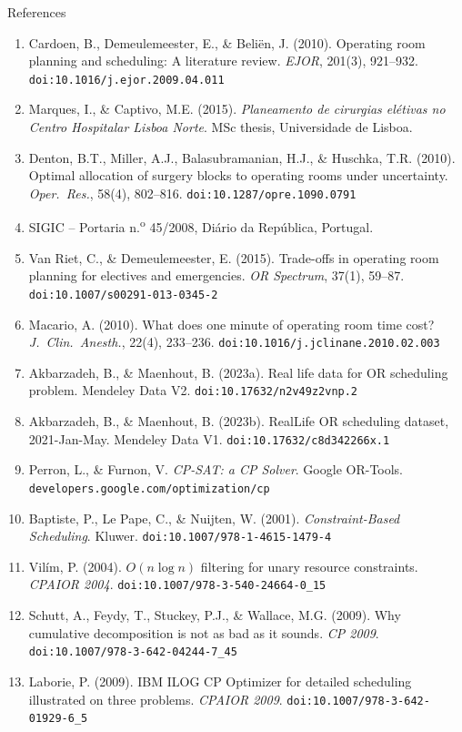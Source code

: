 \documentclass[10pt,aspectratio=169]{beamer}
\newcommand{\bk}{\hfill\hyperlink{toc}{\beamerreturnbutton{Agenda}}}
\begin{document}
\begin{frame}{References}
  \tiny
  \begin{enumerate}
    \item Cardoen, B., Demeulemeester, E., \& Beli\"en, J. (2010).
      Operating room planning and scheduling: A literature review.
      \emph{EJOR}, 201(3), 921--932.
      \texttt{doi:10.1016/j.ejor.2009.04.011}
    \item Marques, I., \& Captivo, M.E. (2015).
      \emph{Planeamento de cirurgias el\'etivas no Centro Hospitalar
      Lisboa Norte}. MSc thesis, Universidade de Lisboa.
    \item Denton, B.T., Miller, A.J., Balasubramanian, H.J., \&
      Huschka, T.R. (2010). Optimal allocation of surgery blocks to
      operating rooms under uncertainty. \emph{Oper.\ Res.}, 58(4),
      802--816. \texttt{doi:10.1287/opre.1090.0791}
    \item SIGIC -- Portaria n.\textsuperscript{o} 45/2008,
      Di\'ario da Rep\'ublica, Portugal.
    \item Van Riet, C., \& Demeulemeester, E. (2015). Trade-offs in
      operating room planning for electives and emergencies.
      \emph{OR Spectrum}, 37(1), 59--87.
      \texttt{doi:10.1007/s00291-013-0345-2}
    \item Macario, A. (2010). What does one minute of operating room
      time cost? \emph{J.\ Clin.\ Anesth.}, 22(4), 233--236.
      \texttt{doi:10.1016/j.jclinane.2010.02.003}
    \item Akbarzadeh, B., \& Maenhout, B. (2023a). Real life data for
      OR scheduling problem. Mendeley Data V2.
      \texttt{doi:10.17632/n2v49z2vnp.2}
    \item Akbarzadeh, B., \& Maenhout, B. (2023b). RealLife OR
      scheduling dataset, 2021-Jan-May. Mendeley Data V1.
      \texttt{doi:10.17632/c8d342266x.1}
    \item Perron, L., \& Furnon, V. \emph{CP-SAT: a CP Solver}.
      Google OR-Tools.
      \texttt{developers.google.com/optimization/cp}
    \item Baptiste, P., Le Pape, C., \& Nuijten, W. (2001).
      \emph{Constraint-Based Scheduling}. Kluwer.
      \texttt{doi:10.1007/978-1-4615-1479-4}
    \item Vil\'im, P. (2004). $O(n\log n)$ filtering for unary
      resource constraints. \emph{CPAIOR 2004}.
      \texttt{doi:10.1007/978-3-540-24664-0\_15}
    \item Schutt, A., Feydy, T., Stuckey, P.J., \& Wallace, M.G.
      (2009). Why cumulative decomposition is not as bad as it sounds.
      \emph{CP 2009}. \texttt{doi:10.1007/978-3-642-04244-7\_45}
    \item Laborie, P. (2009). IBM ILOG CP Optimizer for detailed
      scheduling illustrated on three problems. \emph{CPAIOR 2009}.
      \texttt{doi:10.1007/978-3-642-01929-6\_5}
  \end{enumerate}
  \bk
\end{frame}
\end{document}
